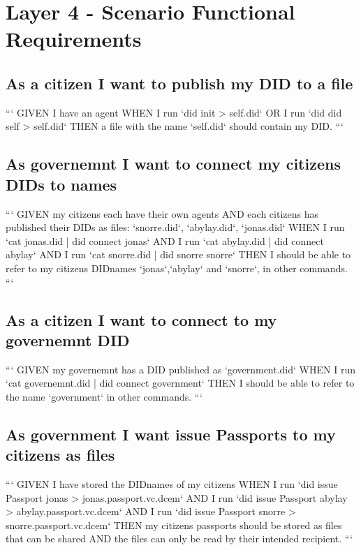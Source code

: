 \section{Layer 4 - Scenario Functional Requirements}

\subsection{As a citizen I want to publish my DID to a file}

```
GIVEN I have an agent
WHEN  I run `did init > self.did`
OR    I run `did did self > self.did`
THEN  a file with the name `self.did` should contain my DID.
```

\subsection{As governemnt I want to connect my citizens DIDs to names}

```
GIVEN my citizens each have their own agents
AND   each citizens has published their DIDs as files: `snorre.did`, `abylay.did`, `jonas.did`
WHEN  I run `cat jonas.did | did connect jonas`
AND   I run `cat abylay.did | did connect abylay`
AND   I run `cat snorre.did | did snorre snorre`
THEN  I should be able to refer to my citizens DIDnames `jonas`,`abylay` and `snorre`, in other commands.
```

\subsection{As a citizen I want to connect to my governemnt DID}

```
GIVEN my governemnt has a DID published as `government.did`
WHEN  I run `cat governemnt.did | did connect government`
THEN  I should be able to refer to the name `government` in other commands.
```

\subsection{As government I want issue Passports to my citizens as files}

```
GIVEN I have stored the DIDnames of my citizens
WHEN  I run `did issue Passport jonas > jonas.passport.vc.dcem`
AND   I run `did issue Passport abylay > abylay.passport.vc.dcem`
AND   I run `did issue Passport snorre > snorre.passport.vc.dcem`
THEN  my citizens passports should be stored as files that can be shared
AND   the files can only be read by their intended recipient.
```

